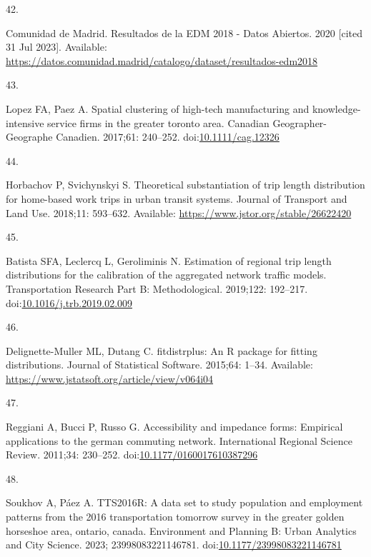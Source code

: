 \documentclass[10pt,letterpaper]{article}
\newlength{\cslhangindent}
\newlength{\csllabelwidth}
\newlength{\cslentryspacingunit} %
\newenvironment{CSLReferences}[2] %
 {%
  \setlength{\parindent}{0pt}
  \ifodd #1
  \let\oldpar\par
  \def\par{\hangindent=\cslhangindent\oldpar}
  \fi
  \setlength{\parskip}{#2\cslentryspacingunit}
 }%
 {}
\newcommand{\CSLLeftMargin}[1]{\parbox[t]{\csllabelwidth}{#1}}
\newcommand{\CSLRightInline}[1]{\parbox[t]{\linewidth - \csllabelwidth}{#1}\break}
\begin{document}
\begin{CSLReferences}{0}{0}
\leavevmode{}%
\CSLLeftMargin{42. }%
\CSLRightInline{Comunidad de Madrid. Resultados de la {EDM} 2018 - Datos
Abiertos. 2020 {[}cited 31 Jul 2023{]}. Available:
\url{https://datos.comunidad.madrid/catalogo/dataset/resultados-edm2018}}

\leavevmode{}%
\CSLLeftMargin{43. }%
\CSLRightInline{Lopez FA, Paez A. Spatial clustering of high-tech
manufacturing and knowledge-intensive service firms in the greater
toronto area. Canadian Geographer-Geographe Canadien. 2017;61: 240--252.
doi:\href{https://doi.org/10.1111/cag.12326}{10.1111/cag.12326}}

\leavevmode{}%
\CSLLeftMargin{44. }%
\CSLRightInline{Horbachov P, Svichynskyi S. Theoretical substantiation
of trip length distribution for home-based work trips in urban transit
systems. Journal of Transport and Land Use. 2018;11: 593--632.
Available: \url{https://www.jstor.org/stable/26622420}}

\leavevmode{}%
\CSLLeftMargin{45. }%
\CSLRightInline{Batista SFA, Leclercq L, Geroliminis N. Estimation of
regional trip length distributions for the calibration of the aggregated
network traffic models. Transportation Research Part B: Methodological.
2019;122: 192--217.
doi:\href{https://doi.org/10.1016/j.trb.2019.02.009}{10.1016/j.trb.2019.02.009}}

\leavevmode{}%
\CSLLeftMargin{46. }%
\CSLRightInline{Delignette-Muller ML, Dutang C. {fitdistrplus}: An {R}
package for fitting distributions. Journal of Statistical Software.
2015;64: 1--34. Available:
\url{https://www.jstatsoft.org/article/view/v064i04}}

\leavevmode{}%
\CSLLeftMargin{47. }%
\CSLRightInline{Reggiani A, Bucci P, Russo G. Accessibility and
impedance forms: Empirical applications to the german commuting network.
International Regional Science Review. 2011;34: 230--252.
doi:\href{https://doi.org/10.1177/0160017610387296}{10.1177/0160017610387296}}

\leavevmode{}%
\CSLLeftMargin{48. }%
\CSLRightInline{Soukhov A, Páez A. {TTS}2016R: A data set to study
population and employment patterns from the 2016 transportation tomorrow
survey in the greater golden horseshoe area, ontario, canada.
Environment and Planning B: Urban Analytics and City Science. 2023;
23998083221146781.
doi:\href{https://doi.org/10.1177/23998083221146781}{10.1177/23998083221146781}}

\end{CSLReferences}

\nolinenumbers
\end{document}
